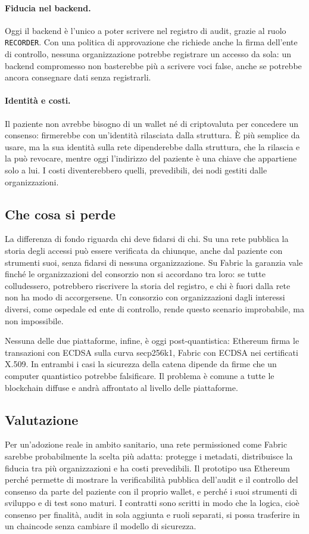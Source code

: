 \paragraph{Fiducia nel backend.} Oggi il backend è l'unico a poter scrivere nel registro di audit, grazie al ruolo \texttt{RECORDER}. Con una politica di approvazione che richiede anche la firma dell'ente di controllo, nessuna organizzazione potrebbe registrare un accesso da sola: un backend compromesso non basterebbe più a scrivere voci false, anche se potrebbe ancora consegnare dati senza registrarli.

\paragraph{Identità e costi.} Il paziente non avrebbe bisogno di un wallet né di criptovaluta per concedere un consenso: firmerebbe con un'identità rilasciata dalla struttura. È più semplice da usare, ma la sua identità sulla rete dipenderebbe dalla struttura, che la rilascia e la può revocare, mentre oggi l'indirizzo del paziente è una chiave che appartiene solo a lui. I costi diventerebbero quelli, prevedibili, dei nodi gestiti dalle organizzazioni.

\subsection{Che cosa si perde}
La differenza di fondo riguarda chi deve fidarsi di chi. Su una rete pubblica la storia degli accessi può essere verificata da chiunque, anche dal paziente con strumenti suoi, senza fidarsi di nessuna organizzazione. Su Fabric la garanzia vale finché le organizzazioni del consorzio non si accordano tra loro: se tutte colludessero, potrebbero riscrivere la storia del registro, e chi è fuori dalla rete non ha modo di accorgersene. Un consorzio con organizzazioni dagli interessi diversi, come ospedale ed ente di controllo, rende questo scenario improbabile, ma non impossibile.

Nessuna delle due piattaforme, infine, è oggi post-quantistica: Ethereum firma le transazioni con ECDSA sulla curva secp256k1, Fabric con ECDSA nei certificati X.509. In entrambi i casi la sicurezza della catena dipende da firme che un computer quantistico potrebbe falsificare. Il problema è comune a tutte le blockchain diffuse e andrà affrontato al livello delle piattaforme.

\subsection{Valutazione}
Per un'adozione reale in ambito sanitario, una rete permissioned come Fabric sarebbe probabilmente la scelta più adatta: protegge i metadati, distribuisce la fiducia tra più organizzazioni e ha costi prevedibili. Il prototipo usa Ethereum perché permette di mostrare la verificabilità pubblica dell'audit e il controllo del consenso da parte del paziente con il proprio wallet, e perché i suoi strumenti di sviluppo e di test sono maturi. I contratti sono scritti in modo che la logica, cioè consenso per finalità, audit in sola aggiunta e ruoli separati, si possa trasferire in un chaincode senza cambiare il modello di sicurezza.

